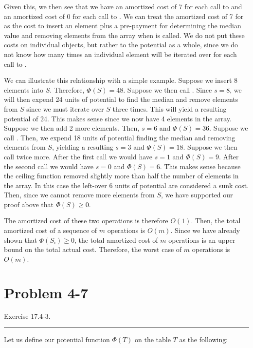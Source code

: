 \documentclass[11pt]{article}
\def\separateline{\medskip\hrule\medskip}
\begin{document}
Given this, we then see that we have an amortized cost of 7 for each call to  and an amortized cost of 0 for each call to . We can treat the amortized cost of 7 for  as the cost to insert an element plus a pre-payment for determining the median value and removing elements from the array when  is called. We do not put these costs on individual objects, but rather to the potential as a whole, since we do not know how many times an individual element will be iterated over for each call to .

We can illustrate this relationship with a simple example. Suppose we insert 8 elements into $S$. Therefore, $\Phi(S) = 48$. Suppose we then call . Since $s=8$, we will then expend 24 units of potential to find the median and remove elements from $S$ since we must iterate over $S$ three times. This will yield a resulting potential of 24. This makes sense since we now have 4 elements in the array. Suppose we then add 2 more elements. Then, $s=6$ and $\Phi(S) = 36$. Suppose we call . Then, we expend 18 units of potential finding the median and removing elements from $S$, yielding a resulting $s=3$ and $\Phi(S) = 18$. Suppose we then call  twice more. After the first call we would have $s=1$ and $\Phi(S) = 9$. After the second call we would have $s=0$ and $\Phi(S) = 6$. This makes sense because the ceiling function removed slightly more than half the number of elements in the array. In this case the left-over 6 units of potential are considered a sunk cost. Then, since we cannot remove more elements from $S$, we have supported our proof above that $\Phi(S) \geq 0$.

The amortized cost of these two operations is therefore $O(1)$. Then, the total amortized cost of a sequence of $m$ operations is $O(m)$. Since we have already shown that $\Phi(S_i) \geq 0$, the total amortized cost of $m$ operations is an upper bound on the total actual cost. Therefore, the worst case of $m$ operations is $O(m)$.

\newpage

\section{Problem 4-7}
Exercise 17.4-3.
\separateline

Let us define our potential function $\Phi(T)$ on the table $T$ as the following:
\end{document}
